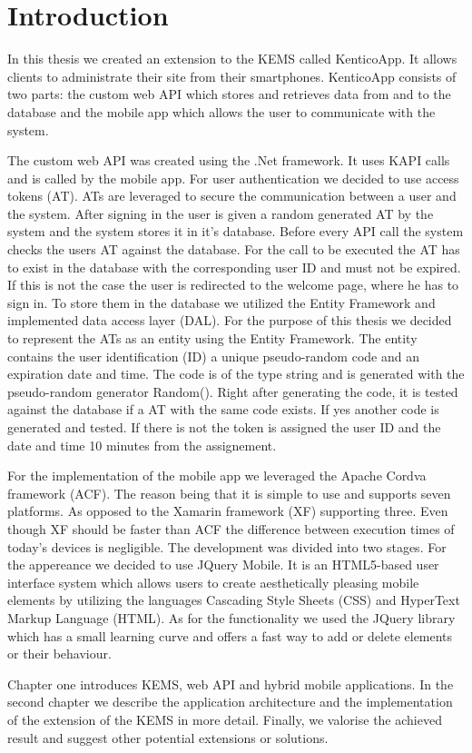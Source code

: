 \section{Introduction} \label{introduction}
In this thesis we created an extension to the KEMS called KenticoApp. It allows clients to administrate their site from their smartphones. KenticoApp consists of two parts: the custom web API which stores and retrieves data from and to the database and the mobile app which allows the user to communicate with the system. 

The custom web API was created using the .Net framework. It uses KAPI calls and is called by the mobile app. For user authentication we decided to use access tokens (AT). ATs are leveraged to secure the communication between a user and the system. After signing in the user is given a random generated AT by the system and the system stores it in it's database. Before every API call the system checks the users AT against the database. For the call to be executed the AT has to exist in the database with the corresponding user ID and must not be expired. If this is not the case the user is redirected to the welcome page, where he has to sign in. To store them in the database we utilized the Entity Framework and implemented data access layer (DAL). For the purpose of this thesis we decided to represent the ATs as an entity using the Entity Framework. The entity contains the user identification (ID) a unique pseudo-random code and an expiration date and time. The code is of the type string and is generated with the pseudo-random generator Random(). Right after generating the code, it is tested against the database if a AT with the same code exists. If yes another code is generated and tested. If there is not the token is assigned the user ID and the date and time 10 minutes from the assignement. 

For the implementation of the mobile app we leveraged the Apache Cordva framework (ACF). The reason being that it is simple to use and supports seven platforms. As opposed to the Xamarin framework (XF) supporting three. Even though XF should be faster than ACF the difference between execution times of today's devices is negligible. The development was divided into two stages. For the appereance we decided to use JQuery Mobile. It is an HTML5-based user interface system which allows users to create aesthetically pleasing mobile elements by utilizing the languages Cascading Style Sheets (CSS) and HyperText Markup Language (HTML). As for the functionality we used the JQuery library which has a small learning curve and offers a fast way to add or delete elements or their behaviour. 

Chapter one introduces KEMS, web API and hybrid mobile applications. In the second chapter we describe the application architecture and the implementation of the extension of the KEMS in more detail. Finally, we valorise the achieved result and suggest other potential extensions or solutions.